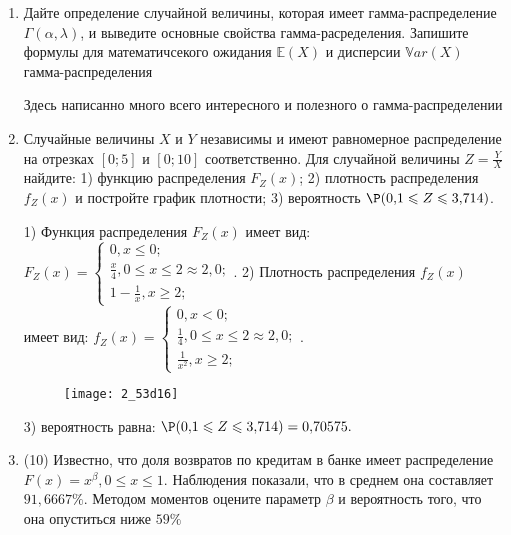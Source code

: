 \documentclass[a4paper,12pt]{article}
\begin{document}
\begin{enumerate}


\item

Дайте определение случайной величины, которая имеет гамма-распределение $\Gamma(\alpha,  \lambda)$, и выведите основные свойства гамма-расределения. Запишите формулы для математичсекого ожидания
$\mathbb{E}(X)$ и дисперсии $\mathbb{V}ar(X)$ гамма-распределения




Здесь написанно много всего интересного и полезного о гамма-распределении


\item



Случайные величины $X$ и $Y$ независимы и имеют равномерное
распределение на отрезках $[0;5]$ и $[0;10]$ соответственно. Для случайной величины $Z=\frac{Y}{X}$ найдите: 
1) функцию распределения $F_Z(x)$;
2) плотность распределения $f_Z(x)$ и постройте график плотности;
3) вероятность $\P(0,\!1\leqslant Z\leqslant 3,\!714)$.




1) Функция распределения $F_Z(x)$ имеет вид:
$
F_Z(x)=\left\{
\begin{array}{l}
0, x\leqslant 0;\\
\frac{x}{4}, 0\leqslant x\leqslant 2\approx 2,\!0;\\
1 - \frac{1}{x}, x\geqslant2;
\end{array}.
\right.
$
2) Плотность распределения $f_Z(x)$ имеет вид:
$
f_Z(x)=\left\{
\begin{array}{l}
0, x<0;\\
\frac{1}{4}, 0\leqslant x\leqslant 2\approx 2,\!0;\\
\frac{1}{x^{2}}, x\geqslant2;
\end{array}.
\right.
$


\begin{figure}[H]
    \texttt{[image: 2\_53d16]}
\end{figure}


3) вероятность равна:
$
\P(0,\!1\leqslant Z\leqslant 3,\!714)=
0,\!70575.
$


\item

(10) Известно, что доля возвратов по кредитам в банке имеет распределение $F(x) = x ^{\beta}, 0 \leqslant x \leqslant 1$.
Наблюдения показали, что в среднем она составляет $91,6667\%$. Методом моментов оцените параметр $\beta$ и
вероятность того, что она опуститься ниже $59\%$





\end{enumerate}
\end{document}

